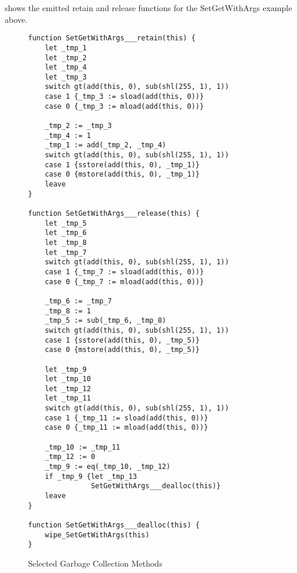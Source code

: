 \documentclass[sigplan,nonacm,screen]{acmart}
\begin{document}
 shows the emitted retain and release functions for the SetGetWithArgs example above.
\begin{figure}[hbtp]
    \caption{Selected Garbage Collection Methods}
    \label{code.9}
    \begin{lstlisting}[language=yul,frame=single]
function SetGetWithArgs___retain(this) {
    let _tmp_1
    let _tmp_2
    let _tmp_4
    let _tmp_3
    switch gt(add(this, 0), sub(shl(255, 1), 1))
    case 1 {_tmp_3 := sload(add(this, 0))}
    case 0 {_tmp_3 := mload(add(this, 0))}

    _tmp_2 := _tmp_3
    _tmp_4 := 1
    _tmp_1 := add(_tmp_2, _tmp_4)
    switch gt(add(this, 0), sub(shl(255, 1), 1))
    case 1 {sstore(add(this, 0), _tmp_1)}
    case 0 {mstore(add(this, 0), _tmp_1)}
    leave
}

function SetGetWithArgs___release(this) {
    let _tmp_5
    let _tmp_6
    let _tmp_8
    let _tmp_7
    switch gt(add(this, 0), sub(shl(255, 1), 1))
    case 1 {_tmp_7 := sload(add(this, 0))}
    case 0 {_tmp_7 := mload(add(this, 0))}

    _tmp_6 := _tmp_7
    _tmp_8 := 1
    _tmp_5 := sub(_tmp_6, _tmp_8)
    switch gt(add(this, 0), sub(shl(255, 1), 1))
    case 1 {sstore(add(this, 0), _tmp_5)}
    case 0 {mstore(add(this, 0), _tmp_5)}

    let _tmp_9
    let _tmp_10
    let _tmp_12
    let _tmp_11
    switch gt(add(this, 0), sub(shl(255, 1), 1))
    case 1 {_tmp_11 := sload(add(this, 0))}
    case 0 {_tmp_11 := mload(add(this, 0))}

    _tmp_10 := _tmp_11
    _tmp_12 := 0
    _tmp_9 := eq(_tmp_10, _tmp_12)
    if _tmp_9 {let _tmp_13
               SetGetWithArgs___dealloc(this)}
    leave
}

function SetGetWithArgs___dealloc(this) {
    wipe_SetGetWithArgs(this)
}

    \end{lstlisting}
\end{figure}
\end{document}
